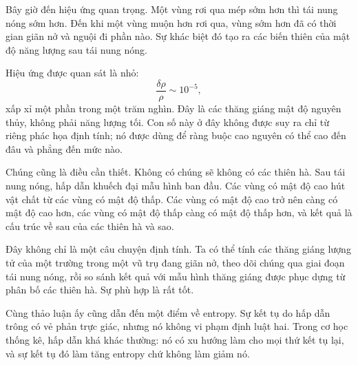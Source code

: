 Bây giờ đến hiệu ứng quan trọng. Một vùng rơi qua mép sớm hơn thì tái nung nóng sớm hơn. Đến khi một vùng muộn hơn rơi qua, vùng sớm hơn đã có thời gian giãn nở và nguội đi phần nào. Sự khác biệt đó tạo ra các biến thiên của mật độ năng lượng sau tái nung nóng.

\begin{classroomqa}
\end{classroomqa}

Hiệu ứng được quan sát là nhỏ:
\begin{equation}
\frac{\delta\rho}{\rho}\sim 10^{-5},
\end{equation}
xấp xỉ một phần trong một trăm nghìn. Đây là các thăng giáng mật độ nguyên thủy, không phải năng lượng tối. Con số này ở đây không được suy ra chỉ từ riêng phác họa định tính; nó được dùng để ràng buộc cao nguyên có thể cao đến đâu và phẳng đến mức nào.

Chúng cũng là điều cần thiết. Không có chúng sẽ không có các thiên hà. Sau tái nung nóng, hấp dẫn khuếch đại mẫu hình ban đầu. Các vùng có mật độ cao hút vật chất từ các vùng có mật độ thấp. Các vùng có mật độ cao trở nên càng có mật độ cao hơn, các vùng có mật độ thấp càng có mật độ thấp hơn, và kết quả là cấu trúc về sau của các thiên hà và sao.

Đây không chỉ là một câu chuyện định tính. Ta có thể tính các thăng giáng lượng tử của một trường trong một vũ trụ đang giãn nở, theo dõi chúng qua giai đoạn tái nung nóng, rồi so sánh kết quả với mẫu hình thăng giáng được phục dựng từ phân bố các thiên hà. Sự phù hợp là rất tốt.

Cùng thảo luận ấy cũng dẫn đến một điểm về entropy. Sự kết tụ do hấp dẫn trông có vẻ phản trực giác, nhưng nó không vi phạm định luật hai. Trong cơ học thống kê, hấp dẫn khá khác thường: nó có xu hướng làm cho mọi thứ kết tụ lại, và sự kết tụ đó làm tăng entropy chứ không làm giảm nó.

\begin{classroomqa}
\end{classroomqa}

